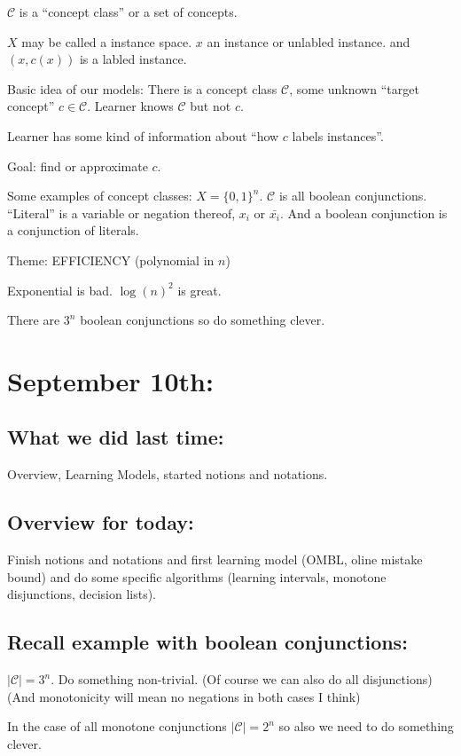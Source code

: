\documentclass[10pt]{article}
\newcommand{\mcC}{\mathcal{C}}
\begin{document}
\(\mcC\) is a ``concept class'' or a set of concepts. 

\(X\) may be called a instance space. \(x\) an instance or unlabled instance. and \((x, c(x))\) is a labled instance. 

Basic idea of our models: There is a concept class \(\mcC\), some unknown ``target concept'' \(c \in \mcC\). Learner knows \(\mcC\) but not \(c\). 

Learner has some kind of information about ``how \(c\) labels instances''. 

Goal: find or approximate \(c\). 

Some examples of concept classes: \(X = \{0, 1\}^n\). \(\mcC\) is all boolean conjunctions. ``Literal'' is a variable or negation thereof, \(x_i\) or \( \bar{x_i}\). 
And a boolean conjunction is a conjunction of literals. 

Theme: EFFICIENCY (polynomial in \(n\))

Exponential is bad. \(\log(n)^2\) is great. 

There are \(3^n\) boolean conjunctions so do something clever. 

\section{September 10th:}

\subsection{What we did last time:}
Overview, Learning Models, started notions and notations. 

\subsection{Overview for today:}
Finish notions and notations and first learning model (OMBL, oline mistake bound) and do some specific algorithms (learning intervals, monotone disjunctions, decision lists).  

\subsection{Recall example with boolean conjunctions:}
\(|\mcC| = 3^n\). Do something non-trivial. 
(Of course we can also do all disjunctions)
(And monotonicity will mean no negations in both cases I think)

In the case of all monotone conjunctions \(|\mcC| = 2^n\) so also we need to do something clever. 
\end{document}
